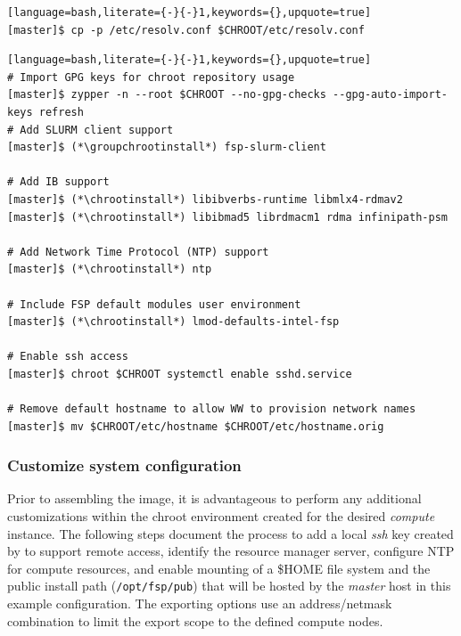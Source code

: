 \documentclass[letterpaper]{article}
\newcommand{\chrootinstall}{zypper -n --root \$CHROOT install}
\newcommand{\groupchrootinstall}{zypper -n --root \$CHROOT install -t pattern}
\begin{document}
\begin{lstlisting}[language=bash,literate={-}{-}1,keywords={},upquote=true]
[master]$ cp -p /etc/resolv.conf $CHROOT/etc/resolv.conf
\end{lstlisting}

\begin{lstlisting}[language=bash,literate={-}{-}1,keywords={},upquote=true]
# Import GPG keys for chroot repository usage
[master]$ zypper -n --root $CHROOT --no-gpg-checks --gpg-auto-import-keys refresh
# Add SLURM client support
[master]$ (*\groupchrootinstall*) fsp-slurm-client

# Add IB support
[master]$ (*\chrootinstall*) libibverbs-runtime libmlx4-rdmav2
[master]$ (*\chrootinstall*) libibmad5 librdmacm1 rdma infinipath-psm

# Add Network Time Protocol (NTP) support
[master]$ (*\chrootinstall*) ntp

# Include FSP default modules user environment
[master]$ (*\chrootinstall*) lmod-defaults-intel-fsp

# Enable ssh access 
[master]$ chroot $CHROOT systemctl enable sshd.service

# Remove default hostname to allow WW to provision network names
[master]$ mv $CHROOT/etc/hostname $CHROOT/etc/hostname.orig
\end{lstlisting}


\subsubsection{Customize system configuration} \label{sec:master_customization}

Prior to assembling the image, it is advantageous to perform any additional
customizations within the chroot environment created for the desired {\em
  compute} instance. The following steps document the process to add a local
{\em ssh} key created by \Warewulf{} to support remote access, identify the
resource manager server, configure NTP for compute resources, and enable \NFS{}
mounting of a \$HOME file system and the public \FSP{} install path
(\texttt{/opt/fsp/pub}) that will be hosted by the {\em master} host in this
example configuration.  The \NFS{} exporting options use an address/netmask
combination to limit the export scope to the defined compute nodes.
\end{document}
